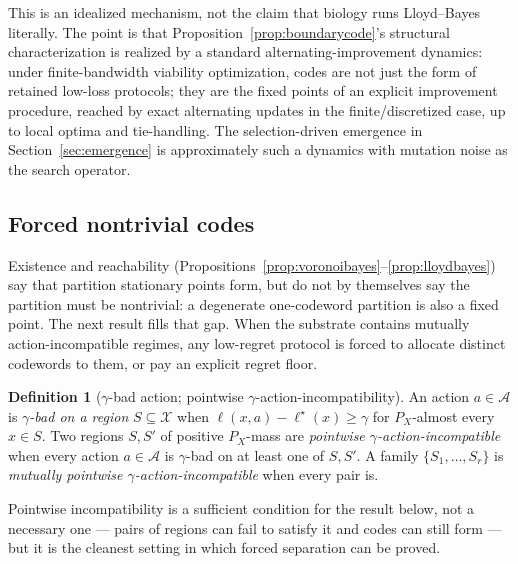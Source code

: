 \documentclass[12pt]{article}
\theoremstyle{definition}
\newtheorem{definition}{Definition}
\newcommand{\X}{\mathcal{X}}
\newcommand{\A}{\mathcal{A}}
\begin{document}
This is an idealized mechanism, not the claim that biology runs Lloyd--Bayes literally. The point is that Proposition~\ref{prop:boundarycode}'s structural characterization is realized by a standard alternating-improvement dynamics: under finite-bandwidth viability optimization, codes are not just the form of retained low-loss protocols; they are the fixed points of an explicit improvement procedure, reached by exact alternating updates in the finite/discretized case, up to local optima and tie-handling. The selection-driven emergence in Section~\ref{sec:emergence} is approximately such a dynamics with mutation noise as the search operator.

\subsection{Forced nontrivial codes}
\label{sec:forced}

Existence and reachability (Propositions~\ref{prop:voronoibayes}--\ref{prop:lloydbayes}) say that partition stationary points form, but do not by themselves say the partition must be nontrivial: a degenerate one-codeword partition is also a fixed point. The next result fills that gap. When the substrate contains mutually action-incompatible regimes, any low-regret protocol is forced to allocate distinct codewords to them, or pay an explicit regret floor.

\begin{definition}[$\gamma$-bad action; pointwise $\gamma$-action-incompatibility]
\label{def:incompatible}
An action $a \in \A$ is \emph{$\gamma$-bad on a region} $S \subseteq \X$ when $\ell(x,a) - \ell^\star(x) \geq \gamma$ for $P_X$-almost every $x \in S$. Two regions $S, S'$ of positive $P_X$-mass are \emph{pointwise $\gamma$-action-incompatible} when every action $a \in \A$ is $\gamma$-bad on at least one of $S, S'$. A family $\{S_1, \ldots, S_r\}$ is \emph{mutually pointwise $\gamma$-action-incompatible} when every pair is.
\end{definition}

Pointwise incompatibility is a sufficient condition for the result below, not a necessary one --- pairs of regions can fail to satisfy it and codes can still form --- but it is the cleanest setting in which forced separation can be proved.
\end{document}
